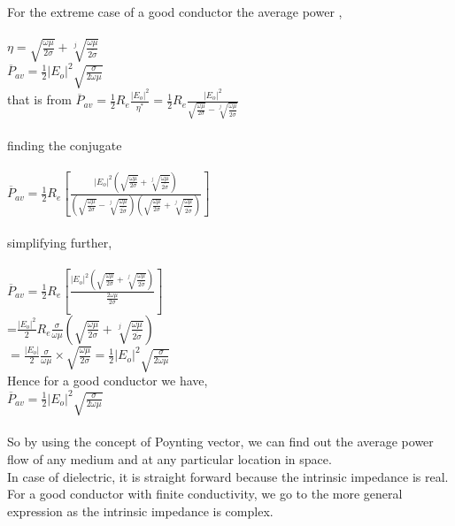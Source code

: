 For the extreme case of a good conductor the average power ,\\\\$ \eta=\sqrt{\frac{\omega\mu}{2\sigma}}+\sqrt[j]{\frac{\omega\mu}{\overline{2\sigma}}} $\\$ \overline{P}_{av}=\frac{1}{2}|E_{o}|^{2}\sqrt{\frac{\sigma}{2\omega\mu}} $\\that is from
 $\overline{P}_{av}=\frac{1}{2}R_{e}\frac{|E_{o}|^{2}}{\eta^{*}}=\frac{1}{2}R_{e}\frac{|E_{o}|^{2}}{\sqrt{\frac{\omega\mu}{2\sigma}}-\sqrt[j]{\frac{\omega\mu}{\overline{2\sigma}}}} $\\\\finding the conjugate\\\\$\overline{P}_{av}= \frac{1}{2}R_{e}[\frac{|E_{o}|^{2}(\sqrt{\frac{\omega\mu}{2\sigma}}+\sqrt[j]{\frac{\omega\mu}{\overline{2\sigma}}})}{(\sqrt{\frac{\omega\mu}{2\sigma}}-\sqrt[j]{\frac{\omega\mu}{\overline{2\sigma}}})(\sqrt{\frac{\omega\mu}{2\sigma}}+\sqrt[j]{\frac{\omega\mu}{\overline{2\sigma}}})}] $\\\\simplifying further,\\\\
 $\overline{P}_{av}=\frac{1}{2}R_{e}[\frac{|E_{o}|^{2}(\sqrt{\frac{\omega\mu}{2\sigma}}+\sqrt[j]{\frac{\omega\mu}{\overline{2\sigma}}})}{\frac{2\omega\mu}{2\sigma}}] $\\=$ \frac{|E_{o}|^{2}}{2}R_{e}\frac{\sigma}{\omega\mu}(\sqrt{\frac{\omega\mu}{2\sigma}}+\sqrt[j]{\frac{\omega\mu}{\overline{2\sigma}}}) $\\$ =\frac{|E_{o}|}{2}\frac{\sigma}{\omega\mu}\times\sqrt{\frac{\omega\mu}{2\sigma}}=\frac{1}{2}|E_{o}|^{2}\sqrt{\frac{\sigma}{2\omega\mu}} $\\Hence for a good conductor we have,\\$ \overline{P}_{av}=\frac{1}{2}|E_{o}|^{2}\sqrt{\frac{\sigma}{2\omega\mu}} $\\\\So by using the concept of Poynting vector, we can find out the average power flow of any medium and at any particular location in space.\\
In case of dielectric, it is straight forward because the intrinsic impedance is real. For a good conductor with finite conductivity, we go to the more general expression as the intrinsic impedance is complex.
